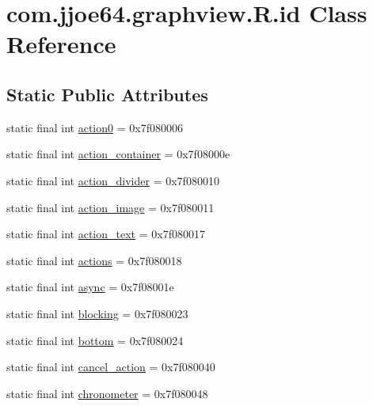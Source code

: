 \hypertarget{classcom_1_1jjoe64_1_1graphview_1_1_r_1_1id}{}\section{com.\+jjoe64.\+graphview.\+R.\+id Class Reference}
\label{classcom_1_1jjoe64_1_1graphview_1_1_r_1_1id}
\subsection*{Static Public Attributes}
\begin{DoxyCompactItemize}
\item 
static final int \mbox{\hyperlink{classcom_1_1jjoe64_1_1graphview_1_1_r_1_1id_a41d8edc56dd76bf1b12003742775af48}{action0}} = 0x7f080006
\item 
static final int \mbox{\hyperlink{classcom_1_1jjoe64_1_1graphview_1_1_r_1_1id_a4c71fcffe249fee5d7f96c178de9a3b6}{action\+\_\+container}} = 0x7f08000e
\item 
static final int \mbox{\hyperlink{classcom_1_1jjoe64_1_1graphview_1_1_r_1_1id_ab9021deed0e7e16d36634b29e1728316}{action\+\_\+divider}} = 0x7f080010
\item 
static final int \mbox{\hyperlink{classcom_1_1jjoe64_1_1graphview_1_1_r_1_1id_a40b952e8a1c15a96155c00b43dcb49b9}{action\+\_\+image}} = 0x7f080011
\item 
static final int \mbox{\hyperlink{classcom_1_1jjoe64_1_1graphview_1_1_r_1_1id_a005992e127483cd494a17f5ddae3ff5d}{action\+\_\+text}} = 0x7f080017
\item 
static final int \mbox{\hyperlink{classcom_1_1jjoe64_1_1graphview_1_1_r_1_1id_ad301adc7c05100d8ef7f8e114fed110b}{actions}} = 0x7f080018
\item 
static final int \mbox{\hyperlink{classcom_1_1jjoe64_1_1graphview_1_1_r_1_1id_a9e34b39616b390dc4e40dd0992de4d94}{async}} = 0x7f08001e
\item 
static final int \mbox{\hyperlink{classcom_1_1jjoe64_1_1graphview_1_1_r_1_1id_aa4e53cbf0efbc14fea000817dd20fed6}{blocking}} = 0x7f080023
\item 
static final int \mbox{\hyperlink{classcom_1_1jjoe64_1_1graphview_1_1_r_1_1id_a9d9baaee5275a2a673fafc3448b93821}{bottom}} = 0x7f080024
\item 
static final int \mbox{\hyperlink{classcom_1_1jjoe64_1_1graphview_1_1_r_1_1id_aa0851c0970e12c3c18fffc09dfc5383b}{cancel\+\_\+action}} = 0x7f080040
\item 
static final int \mbox{\hyperlink{classcom_1_1jjoe64_1_1graphview_1_1_r_1_1id_ad6d22c5b8e20ee1c66257c9fa095a43e}{chronometer}} = 0x7f080048

\end{DoxyCompactItemize}

